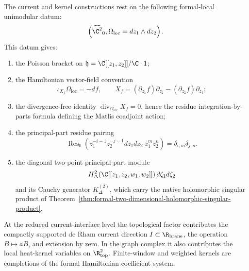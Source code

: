 \begin{prop}
\label{prop:app-local-unimodular-current-kernel-input}
  The current and kernel constructions rest on the following
  formal-local unimodular datum:
  \[
    \left(\widehat{\C^2}_0,\Omega_{\mathrm{loc}}=dz_1\wedge dz_2\right).
  \]
  This datum gives:
  \begin{enumerate}
    \item the Poisson bracket on
    \(\mathfrak h=\C[[z_1,z_2]]/\C\cdot1\);
    \item the Hamiltonian vector-field convention
    \[
      \iota_{X_f}\Omega_{\mathrm{loc}}=-df,\qquad
      X_f=(\partial_{z_1}f)\partial_{z_2}
        -(\partial_{z_2}f)\partial_{z_1};
    \]
    \item the divergence-free identity
    \(\operatorname{div}_{\Omega_{\mathrm{loc}}}X_f=0\), hence the
    residue integration-by-parts formula defining the Matlis coadjoint
    action;
    \item the principal-part residue pairing
    \[
      \operatorname{Res}_0
      \left(z_1^{-i-1}z_2^{-j-1}dz_1dz_2\;z_1^mz_2^n\right)
      =\delta_{i,m}\delta_{j,n}.
    \]
    \item the diagonal two-point principal-part module
    \[
      H^2_\Delta(\C[[z_1,z_2,w_1,w_2]])\,d\zeta_1d\zeta_2
    \]
    and its Cauchy generator \(K^{(2)}_\Delta\), which carry the native
    holomorphic singular product of
    Theorem~\ref{thm:formal-two-dimensional-holomorphic-singular-product}.
  \end{enumerate}
  At the reduced current-interface level the topological factor
  contributes the compactly supported de Rham current direction
  \(I\subset\R_{\mathrm{brane}}\), the operation \(B\mapsto aB\), and
  extension by zero.  In the graph complex it also contributes the local
  heat-kernel variables on \(\R^2_{\mathrm{top}}\).  Finite-window and
  weighted kernels are completions of the formal Hamiltonian coefficient
  system.
\end{prop}

